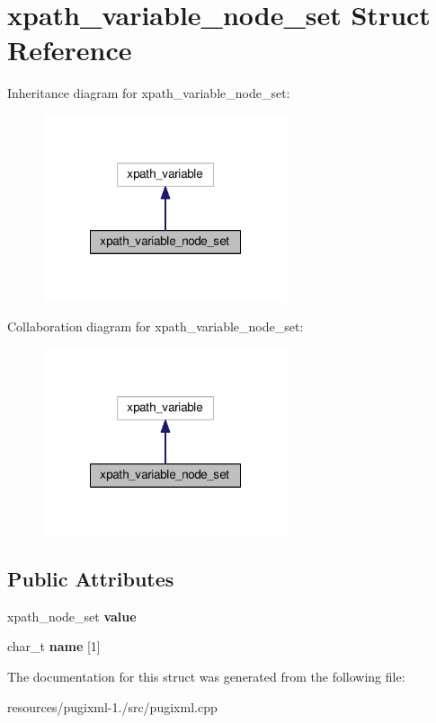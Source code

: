 \hypertarget{structxpath__variable__node__set}{\section{xpath\+\_\+variable\+\_\+node\+\_\+set Struct Reference}
\label{structxpath__variable__node__set}
}


Inheritance diagram for xpath\+\_\+variable\+\_\+node\+\_\+set\+:
\nopagebreak
\begin{figure}[H]
\begin{center}
\leavevmode
\includegraphics[width=204pt]{structxpath__variable__node__set__inherit__graph}
\end{center}
\end{figure}


Collaboration diagram for xpath\+\_\+variable\+\_\+node\+\_\+set\+:
\nopagebreak
\begin{figure}[H]
\begin{center}
\leavevmode
\includegraphics[width=204pt]{structxpath__variable__node__set__coll__graph}
\end{center}
\end{figure}
\subsection*{Public Attributes}
\begin{DoxyCompactItemize}
\item 
\hypertarget{structxpath__variable__node__set_a830ac0dbcaf5f8ff3373d10273e72bf4}{xpath\+\_\+node\+\_\+set {\bfseries value}}\label{structxpath__variable__node__set_a830ac0dbcaf5f8ff3373d10273e72bf4}

\item 
\hypertarget{structxpath__variable__node__set_a9a6a40cea40764364adb3ddba2e7a2ff}{char\+\_\+t {\bfseries name} \mbox{[}1\mbox{]}}\label{structxpath__variable__node__set_a9a6a40cea40764364adb3ddba2e7a2ff}

\end{DoxyCompactItemize}


The documentation for this struct was generated from the following file\+:\begin{DoxyCompactItemize}
\item 
resources/pugixml-\/1./src/pugixml.\+cpp\end{DoxyCompactItemize}
